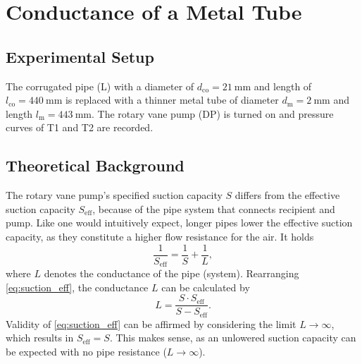 \chapter{Conductance of a Metal Tube}
\section{Experimental Setup}
The corrugated pipe (L) with a diameter of $d_\text{co}=\SI{21}{\milli\meter}$ and length of $l_\text{co}=\SI{440}{\milli\meter}$ is replaced with a thinner metal tube of diameter $d_\text{m}=\SI{2}{\milli\meter}$ and length $l_\text{m}=\SI{443}{\milli\meter}$.
The rotary vane pump (DP) is turned on and pressure curves of T1 and T2 are recorded.

\section{Theoretical Background}
The rotary vane pump's specified suction capacity $S$ differs from the effective suction capacity $S_\text{eff}$, because of the pipe system that connects recipient and pump.
Like one would intuitively expect, longer pipes lower the effective suction capacity, as they constitute a higher flow resistance for the air.
It holds
\begin{equation}\label{eq:suction_eff}
	\frac{1}{S_\text{eff}}=\frac{1}{S}+\frac{1}{L},
\end{equation}
where $L$ denotes the conductance of the pipe (system).
Rearranging \autoref{eq:suction_eff}, the conductance $L$ can be calculated by
\begin{equation}\label{eq:conductance}
	L=\frac{S\cdot S_\text{eff}}{S-S_\text{eff}}.
\end{equation}
Validity of \autoref{eq:suction_eff} can be affirmed by considering the limit $L\rightarrow\infty$, which results in $S_\text{eff}=S$.
This makes sense, as an unlowered suction capacity can be expected with no pipe resistance ($L\rightarrow\infty$).
